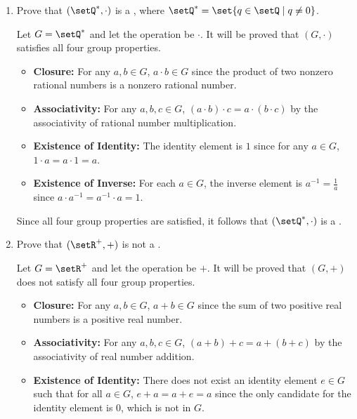 \begin{enumerate}
\begin{subprove}
    Since the existence of inverse property is not satisfied for all elements in \(G\), it follows that \((\setQ, \cdot)\) is not a .
  \end{subprove}
  \item Prove that \((\setQ^*, \cdot)\) is a , where \(\setQ^* = \set{q \in \setQ \mid q \neq 0}\).
  \begin{subprove}
    Let \(G = \setQ^*\) and let the operation be \(\cdot\).
    It will be proved that \((G, \cdot)\) satisfies all four group properties.
    \begin{itemize}
      \item \textbf{Closure:} For any \(a, b \in G\), \(a \cdot b \in G\) since the product of two nonzero rational numbers is a nonzero rational number.
      \item \textbf{Associativity:} For any \(a, b, c \in G\), \((a \cdot b) \cdot c = a \cdot (b \cdot c)\) by the associativity of rational number multiplication.
      \item \textbf{Existence of Identity:} The identity element is \(1\) since for any \(a \in G\), \(1 \cdot a = a \cdot 1 = a\).
      \item \textbf{Existence of Inverse:} For each \(a \in G\), the inverse element is \(a^{-1} = \frac{1}{a}\) since \(a \cdot a^{-1} = a^{-1} \cdot a = 1\).
    \end{itemize}
    Since all four group properties are satisfied, it follows that \((\setQ^*, \cdot)\) is a .
  \end{subprove}
  \item Prove that \((\setR^{+}, +)\) is not a .
  \begin{subprove}
    Let \(G = \setR^{+}\) and let the operation be \(+\).
    It will be proved that \((G, +)\) does not satisfy all four group properties.
    \begin{itemize}
      \item \textbf{Closure:} For any \(a, b \in G\), \(a + b \in G\) since the sum of two positive real numbers is a positive real number.
      \item \textbf{Associativity:} For any \(a, b, c \in G\), \((a + b) + c = a + (b + c)\) by the associativity of real number addition.
      \item \textbf{Existence of Identity:} There does not exist an identity element \(e \in G\) such that for all \(a \in G\), \(e + a = a + e = a\) since the only candidate for the identity element is \(0\), which is not in \(G\).

\end{itemize}
\end{subprove}
\end{enumerate}
